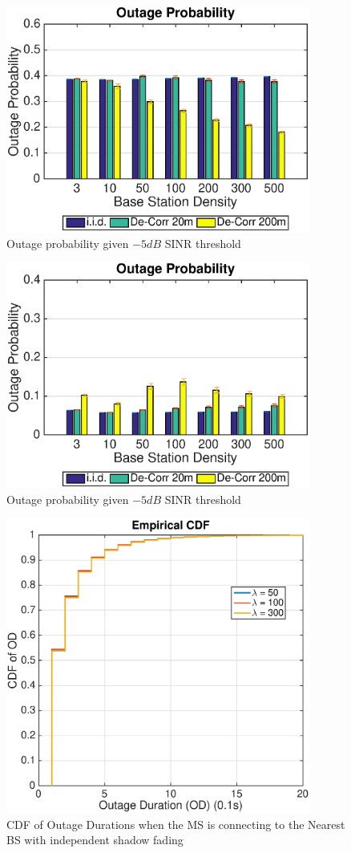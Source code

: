  \begin{figure}
 \centering
 \includegraphics[width=10cm]{NBMax1000OutageProbThresh-5iid.eps}
 \caption{Outage probability given $-5dB$ SINR threshold}
 \label{fig: outprob1}
 \end{figure}
 \begin{figure}
 \centering
 \includegraphics[width=10cm]{MaxMax1000OutageProbThresh-5iid.eps}
 \caption{Outage probability given $-5dB$ SINR threshold}
 \label{fig: outprobs2}
 \end{figure}
 \begin{figure}
 \centering
 \includegraphics[width=10cm]{ODthresh-5iidNB.eps}
 \caption{CDF of Outage Durations when the MS is connecting to the Nearest BS with independent shadow fading}
 \label{iid1}
 \end{figure}
